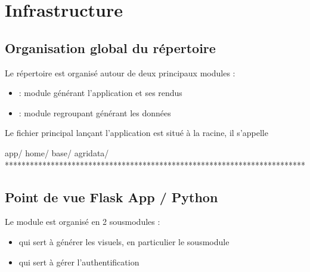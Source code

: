 \documentclass[letterpaper,10pt,french]{sphinxmanual}
\begin{document}
\section{Infrastructure}
\label{\detokenize{infrastructure:infrastructure}}\label{\detokenize{infrastructure::doc}}

\subsection{Organisation global du répertoire}
\label{\detokenize{infrastructure:organisation-global-du-repertoire}}
\sphinxAtStartPar
Le répertoire est organisé autour de deux principaux modules :
\begin{itemize}
\item {} 
\sphinxAtStartPar
{} : module générant l’application et ses rendus

\item {} 
\sphinxAtStartPar
{} : module regroupant générant les données

\end{itemize}

\sphinxAtStartPar
Le fichier principal lançant l’application est situé à la racine, il s’appelle 

\begin{sphinxVerbatim}[commandchars=\\\{\}]
\PYGZhy{}\PYGZhy{} app/                                      
    \PYGZhy{}\PYGZhy{} home/                                
    \PYGZhy{}\PYGZhy{} base/                                
\PYGZhy{}\PYGZhy{} agri\PYGZus{}data/                                
\PYGZhy{}\PYGZhy{} ************************************************************************
\end{sphinxVerbatim}


\subsection{Point de vue Flask App / Python}
\label{\detokenize{infrastructure:point-de-vue-flask-app-python}}
\sphinxAtStartPar
Le module  est organisé en 2 sous\sphinxhyphen{}modules :
\begin{itemize}
\item {} 
\sphinxAtStartPar
{} qui sert à générer les visuels, en particulier le sous\sphinxhyphen{}module 

\item {} 
\sphinxAtStartPar
{} qui sert à gérer l’authentification

\end{itemize}
\end{document}
